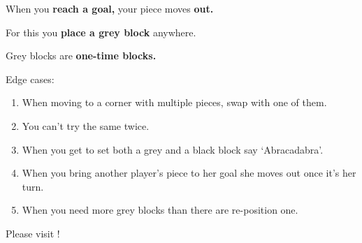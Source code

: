     When you \textbf{reach a goal,} your piece moves \textbf{out. }
    
    For this you \textbf{place a grey block} anywhere.
    
    Grey blocks are \textbf{one-time blocks.}
    
    \skipper

\raggedright

\vspace{5ex}

Edge cases:

    \begin{enumerate}
        \item When moving to a corner with multiple pieces, swap with one of them.
        \item You can't try the same twice.
        \item When you get to set both a grey and a black block say `Abracadabra'.
        \item When you bring another player's piece to her goal she moves out once it's her turn.
        \item When you need more grey blocks than there are re-position one.
    \end{enumerate}


\skipper

\vspace{5ex}


Please visit \website ! 


